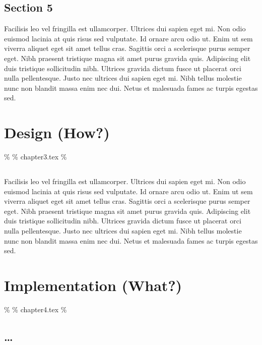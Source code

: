 \documentclass[
  BCOR=10mm, %
  DIV=12, %
  twoside, %
  headsepline, %
  listof=totoc, %
  bibliography=totoc, %
  index=totoc, %
  abstract=true, %
  numbers=noenddot, %
]{cs-thesis}
\begin{document}
    \section{Section 5}\label{section-5-1}

    Facilisis leo vel fringilla est ullamcorper. Ultrices dui sapien
    eget mi. Non odio euismod lacinia at quis risus sed vulputate. Id
    ornare arcu odio ut. Enim ut sem viverra aliquet eget sit amet
    tellus cras. Sagittis orci a scelerisque purus semper eget. Nibh
    praesent tristique magna sit amet purus gravida quis. Adipiscing
    elit duis tristique sollicitudin nibh. Ultrices gravida dictum fusce
    ut placerat orci nulla pellentesque. Justo nec ultrices dui sapien
    eget mi. Nibh tellus molestie nunc non blandit massa enim nec dui.
    Netus et malesuada fames ac turpis egestas sed.


    \chapter{Design (How?)}\label{sec-design}

    \% \% chapter3.tex \%

    \section{}\label{sec-test}

    Facilisis leo vel fringilla est ullamcorper. Ultrices dui sapien
    eget mi. Non odio euismod lacinia at quis risus sed vulputate. Id
    ornare arcu odio ut. Enim ut sem viverra aliquet eget sit amet
    tellus cras. Sagittis orci a scelerisque purus semper eget. Nibh
    praesent tristique magna sit amet purus gravida quis. Adipiscing
    elit duis tristique sollicitudin nibh. Ultrices gravida dictum fusce
    ut placerat orci nulla pellentesque. Justo nec ultrices dui sapien
    eget mi. Nibh tellus molestie nunc non blandit massa enim nec dui.
    Netus et malesuada fames ac turpis egestas sed.


    \chapter{Implementation (What?)}\label{implementation-what}

    \% \% chapter4.tex \%

    \section{\ldots{}}\label{section}
\end{document}
